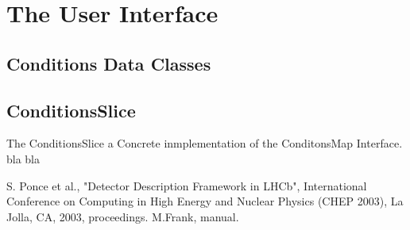 \documentclass[10pt,a4paper]{article}
\begin{document}
\newpage
\section{The User Interface}
\label{sec:ddcond-user-interface}

\subsection{Conditions Data Classes}
\label{subsec:ddcond-data-classes}

\subsection{ConditionsSlice}
\label{subsec:ddcond-data-classes}

\noindent
The ConditionsSlice a Concrete inmplementation of the ConditonsMap Interface.
bla bla

\newpage
\begin{thebibliography}{9}
 S. Ponce et al., 
                "Detector Description Framework in LHCb", 
                International Conference on Computing in High Energy and Nuclear Physics  (CHEP 2003), 
                La Jolla, CA, 2003, proceedings. 
  M.Frank, \DDA manual.
\end{thebibliography}
\end{document}
